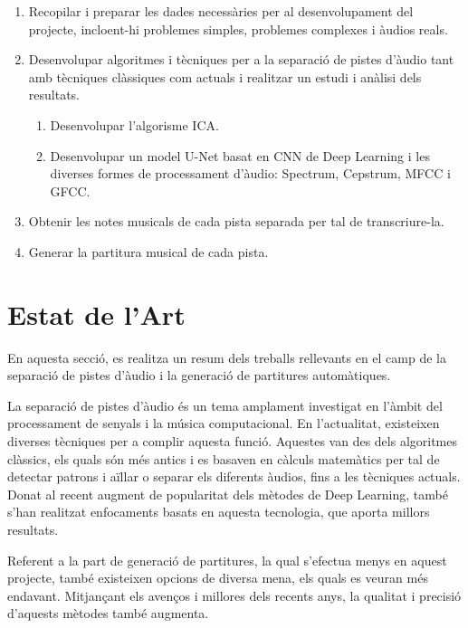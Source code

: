 \documentclass[10pt,a4paper,twocolumn,twoside]{article}
\begin{document}
\begin{enumerate}
    \item Recopilar i preparar les dades necessàries per al desenvolupament del projecte, incloent-hi problemes simples, problemes complexes i àudios reals.
    
    \item Desenvolupar algoritmes i tècniques per a la separació de pistes d'àudio tant amb tècniques clàssiques com actuals i realitzar un estudi i anàlisi dels resultats.
    \begin{enumerate}
        \item Desenvolupar l'algorisme ICA.
        \item Desenvolupar un model U-Net basat en CNN de Deep Learning i les diverses formes de processament d'àudio: Spectrum, Cepstrum, MFCC i GFCC.
    \end{enumerate}
    \item Obtenir les notes musicals de cada pista separada per tal de transcriure-la.
    \item Generar la partitura musical de cada pista.
\end{enumerate}



\section{Estat de l'Art}
\label{sec:estat_art}

En aquesta secció, es realitza un resum dels treballs rellevants en el camp de la separació de pistes d'àudio i la generació de partitures automàtiques.

La separació de pistes d'àudio és un tema amplament investigat en l'àmbit del processament de senyals i la música computacional. En l'actualitat, existeixen diverses tècniques per a complir aquesta funció. Aquestes van des dels algoritmes clàssics, els quals són més antics i es basaven en càlculs matemàtics per tal de detectar patrons i aïllar o separar els diferents àudios, fins a les tècniques actuals. Donat al recent augment de popularitat dels mètodes de Deep Learning, també s'han realitzat enfocaments basats en aquesta tecnologia, que aporta millors resultats.

Referent a la part de generació de partitures, la qual s'efectua menys en aquest projecte, també existeixen opcions de diversa mena, els quals es veuran més endavant. Mitjançant els avenços i millores dels recents anys, la qualitat i precisió d'aquests mètodes també augmenta.
\end{document}
